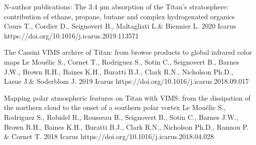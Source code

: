 \begin{cvpublications}{N-author publications:}
	{The 3.4 µm absorption of the Titan's stratosphere: contribution of ethane, propane, butane and complex hydrogenated organics}
	{Cours T., Cordier D., Seignovert B., Maltagliati L.\& Biennier L.}
	{2020}
    {Icarus}
    {https://doi.org/10.1016/j.icarus.2019.113571}

    {The Cassini VIMS archive of Titan: from browse products to global infrared color maps}
	{Le Mouélic S., Cornet T., Rodriguez S., Sotin C., Seignovert B., Barnes J.W., Brown R.H., Baines K.H., Buratti B.J., Clark R.N., Nicholson Ph.D., Lasue J.\& Soderblom J.}
	{2019}
    {Icarus}
    {https://doi.org/10.1016/j.icarus.2018.09.017}

    {Mapping polar atmospheric features on Titan with VIMS: from the dissipation of the northern cloud to the onset of a southern polar vortex}
	{Le Mouélic S., Rodriguez S., Robidel R., Rousseau B., Seignovert B., Sotin C., Barnes J.W., Brown R.H., Baines K.H., Buratti B.J., Clark R.N., Nicholson Ph.D., Rannou P. \& Cornet T.}
	{2018}
    {Icarus}
    {https://doi.org/10.1016/j.icarus.2018.04.028}


\end{cvpublications}
